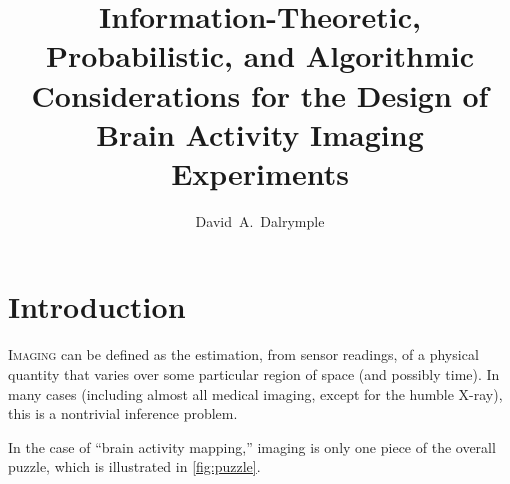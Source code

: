 
\newcommand{\myprod}{\color{purple!60!blue}\hskip0.08pt$\bigotimes$}
%

\title{Information-Theoretic, Probabilistic, and Algorithmic Considerations for the Design of Brain Activity Imaging Experiments}

\author[1,2]{David~A.~Dalrymple}


\newcommand\et{{\em \&}}


\renewcommand{\maketitlehookc}{{\small\raggedright Correspondence to: \texttt{david\,\textnormal{(at)}\,\,dalrymple.co}}}


\maketitle
\pagestyle{plain}
\thispagestyle{empty}

\section{Introduction}

\textsc{Imaging} can be defined as the estimation, from sensor readings, of a physical quantity that varies over some particular region of space (and possibly time). In many cases (including almost all medical imaging, except for the humble X-ray), this is a nontrivial inference problem.

In the case of ``brain activity mapping,'' imaging is only one piece of the overall puzzle, which is illustrated in \autoref{fig:puzzle}.



